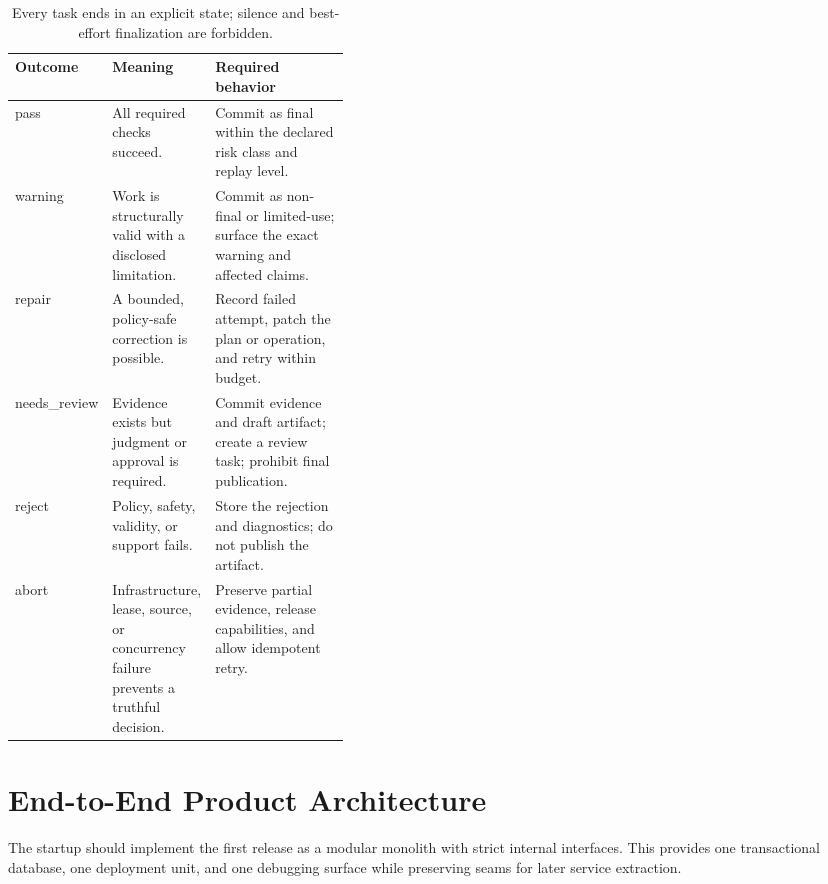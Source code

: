 \documentclass[10pt]{article}
\begin{document}
\begin{table}[ht]
\centering
\small
\begin{tabularx}{\linewidth}{L{0.17\linewidth}L{0.22\linewidth}Y}
\toprule
\textbf{Outcome} & \textbf{Meaning} & \textbf{Required behavior} \\
\midrule
pass & All required checks succeed. & Commit as final within the declared risk class and replay level. \\
warning & Work is structurally valid with a disclosed limitation. & Commit as non-final or limited-use; surface the exact warning and affected claims. \\
repair & A bounded, policy-safe correction is possible. & Record failed attempt, patch the plan or operation, and retry within budget. \\
needs\_review & Evidence exists but judgment or approval is required. & Commit evidence and draft artifact; create a review task; prohibit final publication. \\
reject & Policy, safety, validity, or support fails. & Store the rejection and diagnostics; do not publish the artifact. \\
abort & Infrastructure, lease, source, or concurrency failure prevents a truthful decision. & Preserve partial evidence, release capabilities, and allow idempotent retry. \\
\bottomrule
\end{tabularx}
\caption{Every task ends in an explicit state; silence and best-effort finalization are forbidden.}
\end{table}

\section{End-to-End Product Architecture}

The startup should implement the first release as a modular monolith with strict internal interfaces. This provides one transactional database, one deployment unit, and one debugging surface while preserving seams for later service extraction.
\end{document}
